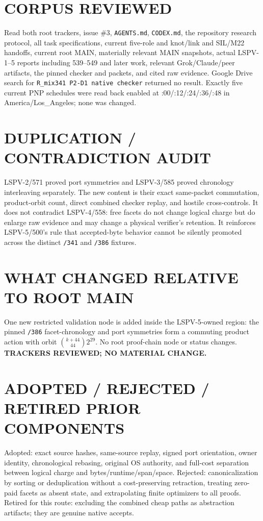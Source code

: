 \documentclass[11pt]{article}
\begin{document}
\section*{CORPUS REVIEWED}
Read both root trackers, issue \#3, \texttt{AGENTS.md}, \texttt{CODEX.md}, the
repository research protocol, all task specifications, current five-role and
knot/link and SIL/M22 handoffs, current root MAIN, materially relevant MAIN
snapshots, actual LSPV-1--5 reports including 539--549 and later work, relevant
Grok/Claude/peer artifacts, the pinned checker and packets, and cited raw
evidence.  Google Drive search for \texttt{R\_mix341 P2-D1 native checker}
returned no result.  Exactly five current PNP schedules were read back enabled
at :00/:12/:24/:36/:48 in America/Los\_Angeles; none was changed.

\section*{DUPLICATION / CONTRADICTION AUDIT}
LSPV-2/571 proved port symmetries and LSPV-3/585 proved chronology
interleaving separately.  The new content is their exact same-packet
commutation, product-orbit count, direct combined checker replay, and hostile
cross-controls.  It does not contradict LSPV-4/558: free facets do not change
logical charge but do enlarge raw evidence and may change a physical verifier's
retention.  It reinforces LSPV-5/500's rule that accepted-byte behavior cannot
be silently promoted across the distinct \texttt{/341} and \texttt{/386}
fixtures.

\section*{WHAT CHANGED RELATIVE TO ROOT MAIN}
One new restricted validation node is added inside the LSPV-5-owned region:
the pinned \texttt{/386} facet-chronology and port symmetries form a commuting
product action with orbit $\binom{k+44}{44}2^{29}$.  No root proof-chain node or
status changes.  \textbf{TRACKERS REVIEWED; NO MATERIAL CHANGE.}

\section*{ADOPTED / REJECTED / RETIRED PRIOR COMPONENTS}
Adopted: exact source hashes, same-source replay, signed port orientation,
owner identity, chronological rebasing, original OS authority, and full-cost
separation between logical charge and bytes/runtime/span/space.  Rejected:
canonicalization by sorting or deduplication without a cost-preserving
retraction, treating zero-paid facets as absent state, and extrapolating finite
optimizers to all proofs.  Retired for this route: excluding the combined cheap
paths as abstraction artifacts; they are genuine native accepts.
\end{document}
